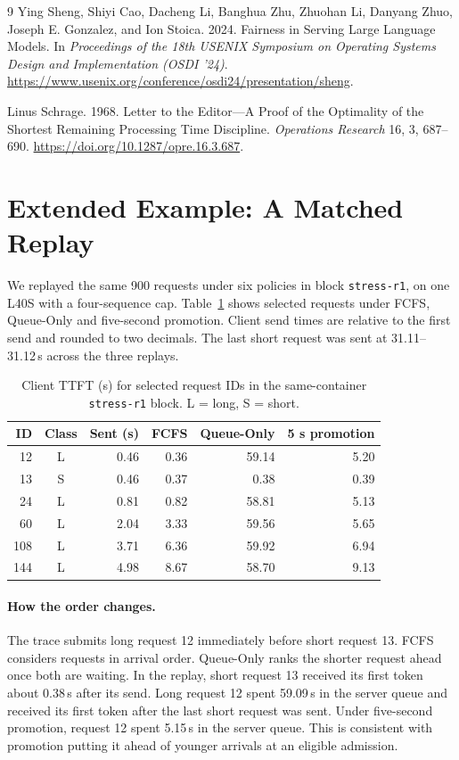 \documentclass[sigplan,nonacm]{acmart}
\begin{document}
\begin{thebibliography}{9}
Ying Sheng, Shiyi Cao, Dacheng Li, Banghua Zhu, Zhuohan Li,
Danyang Zhuo, Joseph E. Gonzalez, and Ion Stoica. 2024.
Fairness in Serving Large Language Models.
In \emph{Proceedings of the 18th USENIX Symposium on Operating Systems
Design and Implementation (OSDI '24)}.
\url{https://www.usenix.org/conference/osdi24/presentation/sheng}.

Linus Schrage. 1968.
Letter to the Editor---A Proof of the Optimality of the Shortest
Remaining Processing Time Discipline.
\emph{Operations Research} 16, 3, 687--690.
\url{https://doi.org/10.1287/opre.16.3.687}.

\end{thebibliography}

\appendix


\section{Extended Example: A Matched Replay}
\label{app:example}

We replayed the same 900 requests under six policies in block
\texttt{stress-r1}, on one L40S with a four-sequence cap.
Table~\ref{tab:example} shows selected requests under FCFS, Queue-Only
and five-second promotion. Client send times are relative to the first
send and rounded to two decimals. The last short request was sent at
31.11--31.12\,s across the three replays.

\begin{table}[h]
\caption{Client TTFT (s) for selected request IDs in the same-container
\texttt{stress-r1} block. L = long, S = short.}
\label{tab:example}
\small
\begin{tabular}{@{}rcrrrr@{}}
\toprule
ID & Class & Sent (s) & FCFS & Queue-Only & 5 s promotion \\
\midrule
12  & L & 0.46 & 0.36 & 59.14 & 5.20 \\
13  & S & 0.46 & 0.37 & 0.38 & 0.39 \\
24  & L & 0.81 & 0.82 & 58.81 & 5.13 \\
60  & L & 2.04 & 3.33 & 59.56 & 5.65 \\
108 & L & 3.71 & 6.36 & 59.92 & 6.94 \\
144 & L & 4.98 & 8.67 & 58.70 & 9.13 \\
\bottomrule
\end{tabular}
\end{table}

\paragraph{How the order changes.}
The trace submits long request 12 immediately before short request 13.
FCFS considers requests in arrival order. Queue-Only ranks the
shorter request ahead once both are waiting. In the replay, short
request 13 received its first token about 0.38\,s after its send.
Long request 12 spent 59.09\,s in the server queue and received its first
token after the last short request was sent. Under five-second
promotion, request 12 spent 5.15\,s in the server queue. This is
consistent with promotion putting it ahead of younger arrivals at an
eligible admission.
\end{document}
